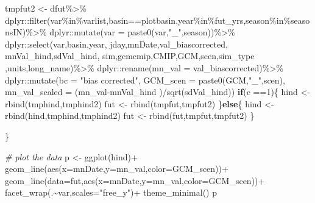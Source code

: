 \documentclass[
]{article}
\newenvironment{Shaded}{\begin{snugshade}}{\end{snugshade}}
\newcommand{\AttributeTok}[1]{\textcolor[rgb]{0.77,0.63,0.00}{#1}}
\newcommand{\CommentTok}[1]{\textcolor[rgb]{0.56,0.35,0.01}{\textit{#1}}}
\newcommand{\ControlFlowTok}[1]{\textcolor[rgb]{0.13,0.29,0.53}{\textbf{#1}}}
\newcommand{\DecValTok}[1]{\textcolor[rgb]{0.00,0.00,0.81}{#1}}
\newcommand{\FunctionTok}[1]{\textcolor[rgb]{0.00,0.00,0.00}{#1}}
\newcommand{\NormalTok}[1]{#1}
\newcommand{\OtherTok}[1]{\textcolor[rgb]{0.56,0.35,0.01}{#1}}
\newcommand{\SpecialCharTok}[1]{\textcolor[rgb]{0.00,0.00,0.00}{#1}}
\newcommand{\StringTok}[1]{\textcolor[rgb]{0.31,0.60,0.02}{#1}}
\begin{document}
\begin{Shaded}
\begin{Highlighting}[]
\NormalTok{       tmpfut2    }\OtherTok{\textless{}{-}}\NormalTok{ dfut}\SpecialCharTok{\%\textgreater{}\%}
\NormalTok{         dplyr}\SpecialCharTok{::}\FunctionTok{filter}\NormalTok{(var}\SpecialCharTok{\%in\%}\NormalTok{varlist,basin}\SpecialCharTok{==}\NormalTok{plotbasin,year}\SpecialCharTok{\%in\%}\NormalTok{fut\_yrs,season}\SpecialCharTok{\%in\%}\NormalTok{seasonsIN)}\SpecialCharTok{\%\textgreater{}\%}
\NormalTok{         dplyr}\SpecialCharTok{::}\FunctionTok{mutate}\NormalTok{(}\AttributeTok{var =} \FunctionTok{paste0}\NormalTok{(var,}\StringTok{"\_"}\NormalTok{,season))}\SpecialCharTok{\%\textgreater{}\%}
\NormalTok{         dplyr}\SpecialCharTok{::}\FunctionTok{select}\NormalTok{(var,basin,year, jday,mnDate,val\_biascorrected, }
\NormalTok{                       mnVal\_hind,sdVal\_hind, sim,gcmcmip,CMIP,GCM,scen,sim\_type ,units,long\_name)}\SpecialCharTok{\%\textgreater{}\%}
\NormalTok{         dplyr}\SpecialCharTok{::}\FunctionTok{rename}\NormalTok{(}\AttributeTok{mn\_val =}\NormalTok{ val\_biascorrected)}\SpecialCharTok{\%\textgreater{}\%}
\NormalTok{         dplyr}\SpecialCharTok{::}\FunctionTok{mutate}\NormalTok{(}\AttributeTok{bc =} \StringTok{"bias corrected"}\NormalTok{,}
                       \AttributeTok{GCM\_scen =} \FunctionTok{paste0}\NormalTok{(GCM,}\StringTok{"\_"}\NormalTok{,scen),}
                       \AttributeTok{mn\_val\_scaled =}\NormalTok{ (mn\_val}\SpecialCharTok{{-}}\NormalTok{mnVal\_hind )}\SpecialCharTok{/}\FunctionTok{sqrt}\NormalTok{(sdVal\_hind))}
       \ControlFlowTok{if}\NormalTok{(c }\SpecialCharTok{==}\DecValTok{1}\NormalTok{)\{}
\NormalTok{          hind  }\OtherTok{\textless{}{-}} \FunctionTok{rbind}\NormalTok{(tmphind,tmphind2)}
\NormalTok{          fut   }\OtherTok{\textless{}{-}} \FunctionTok{rbind}\NormalTok{(tmpfut,tmpfut2)}
\NormalTok{       \}}\ControlFlowTok{else}\NormalTok{\{}
\NormalTok{          hind  }\OtherTok{\textless{}{-}} \FunctionTok{rbind}\NormalTok{(hind,tmphind,tmphind2)}
\NormalTok{          fut   }\OtherTok{\textless{}{-}} \FunctionTok{rbind}\NormalTok{(fut,tmpfut,tmpfut2)}
\NormalTok{       \}}
       
\NormalTok{    \}}
    
      \CommentTok{\# plot the data}
\NormalTok{       p }\OtherTok{\textless{}{-}} \FunctionTok{ggplot}\NormalTok{(hind)}\SpecialCharTok{+}
         \FunctionTok{geom\_line}\NormalTok{(}\FunctionTok{aes}\NormalTok{(}\AttributeTok{x=}\NormalTok{mnDate,}\AttributeTok{y=}\NormalTok{mn\_val,}\AttributeTok{color=}\NormalTok{GCM\_scen))}\SpecialCharTok{+}
         \FunctionTok{geom\_line}\NormalTok{(}\AttributeTok{data=}\NormalTok{fut,}\FunctionTok{aes}\NormalTok{(}\AttributeTok{x=}\NormalTok{mnDate,}\AttributeTok{y=}\NormalTok{mn\_val,}\AttributeTok{color=}\NormalTok{GCM\_scen))}\SpecialCharTok{+}
         \FunctionTok{facet\_wrap}\NormalTok{(.}\SpecialCharTok{\textasciitilde{}}\NormalTok{var,}\AttributeTok{scales=}\StringTok{"free\_y"}\NormalTok{)}\SpecialCharTok{+}
         \FunctionTok{theme\_minimal}\NormalTok{()}
\NormalTok{      p}
      

\end{Highlighting}
\end{Shaded}
\end{document}
